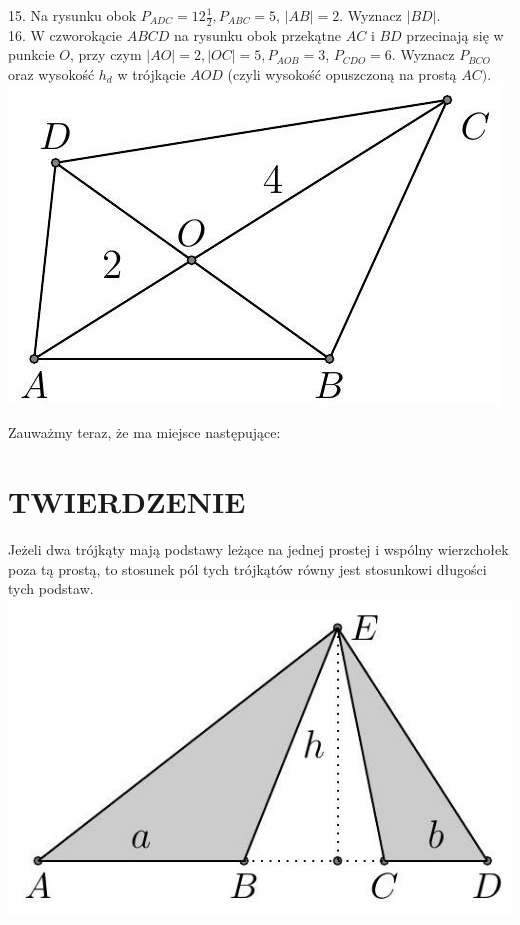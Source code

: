 \documentclass[10pt]{article}
\begin{document}
15. Na rysunku obok \(P_{A D C}=12 \frac{1}{2}, P_{A B C}=5\), \(|A B|=2\). Wyznacz \(|B D|\).\\
16. W czworokącie \(A B C D\) na rysunku obok przekątne \(A C\) i \(B D\) przecinają się w punkcie \(O\), przy czym \(|A O|=2,|O C|=5, P_{A O B}=3\), \(P_{C D O}=6\). Wyznacz \(P_{B C O}\) oraz wysokość \(h_{d}\) w trójkącie \(A O D\) (czyli wysokość opuszczoną na prostą \(A C)\).\\
\includegraphics[max width=\textwidth, center]{2024_11_21_71f62bd117d375398909g-034(3)}

Zauważmy teraz, że ma miejsce następujące:

\section*{TWIERDZENIE}
Jeżeli dwa trójkąty mają podstawy leżące na jednej prostej i wspólny wierzchołek poza tą prostą, to stosunek pól tych trójkątów równy jest stosunkowi długości tych podstaw.\\
\includegraphics[max width=\textwidth, center]{2024_11_21_71f62bd117d375398909g-034}
\end{document}
